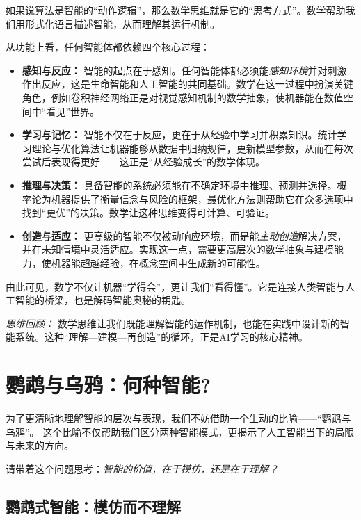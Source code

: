 如果说算法是智能的“动作逻辑”，那么数学思维就是它的“思考方式”。数学帮助我们用形式化语言描述智能，从而理解其运行机制。

从功能上看，任何智能体都依赖四个核心过程：

\begin{itemize}
\item \textbf{感知与反应：} 智能的起点在于感知。任何智能体都必须能\emph{感知环境}并对刺激作出反应，这是生命智能和人工智能的共同基础。数学在这一过程中扮演关键角色，例如卷积神经网络正是对视觉感知机制的数学抽象，使机器能在数值空间中“看见”世界。

\item \textbf{学习与记忆：} 智能不仅在于反应，更在于从经验中学习并积累知识。统计学习理论与优化算法让机器能够从数据中归纳规律，更新模型参数，从而在每次尝试后表现得更好——这正是“从经验成长”的数学体现。

\item \textbf{推理与决策：} 具备智能的系统必须能在不确定环境中推理、预测并选择。概率论为机器提供了衡量信念与风险的框架，最优化方法则帮助它在众多选项中找到“更优”的决策。数学让这种思维变得可计算、可验证。

\item \textbf{创造与适应：} 更高级的智能不仅被动响应环境，而是能\emph{主动创造}解决方案，并在未知情境中灵活适应。实现这一点，需要更高层次的数学抽象与建模能力，使机器能超越经验，在概念空间中生成新的可能性。
\end{itemize}

由此可见，数学不仅让机器“学得会”，更让我们“看得懂”。它是连接人类智能与人工智能的桥梁，也是解码智能奥秘的钥匙。

\noindent\textit{思维回顾：} 数学思维让我们既能理解智能的运作机制，也能在实践中设计新的智能系统。这种“理解—建模—再创造”的循环，正是AI学习的核心精神。


\section{鹦鹉与乌鸦：何种智能?}

为了更清晰地理解智能的层次与表现，我们不妨借助一个生动的比喻——“鹦鹉与乌鸦”。
这个比喻不仅帮助我们区分两种智能模式，更揭示了人工智能当下的局限与未来的方向。

请带着这个问题思考：\emph{智能的价值，在于模仿，还是在于理解？}

\subsection{鹦鹉式智能：模仿而不理解}

